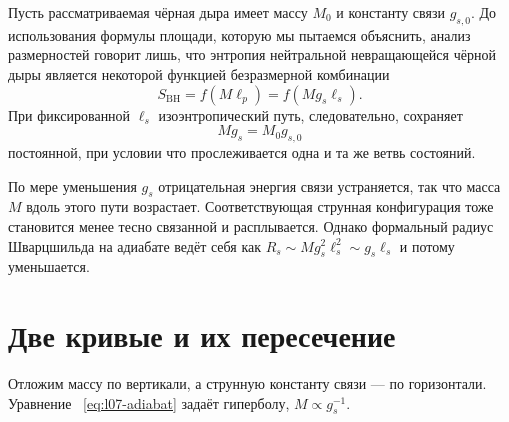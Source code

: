 Пусть рассматриваемая чёрная дыра имеет массу \(M_0\) и константу связи \(g_{s,0}\). До использования формулы площади, которую мы пытаемся объяснить, анализ размерностей говорит лишь, что энтропия нейтральной невращающейся чёрной дыры является некоторой функцией безразмерной комбинации
\begin{equation}
S_{\mathrm{BH}}=f(M\ell_p)
=f(Mg_s\ell_s).
\label{eq:l07-entropy-function}
\end{equation}
При фиксированной \(\ell_s\) изоэнтропический путь, следовательно, сохраняет
\begin{equation}
Mg_s=M_0g_{s,0}
\label{eq:l07-adiabat}
\end{equation}
постоянной, при условии что прослеживается одна и та же ветвь состояний.

По мере уменьшения \(g_s\) отрицательная энергия связи устраняется, так что масса \(M\) вдоль этого пути возрастает. Соответствующая струнная конфигурация тоже становится менее тесно связанной и расплывается. Однако формальный радиус Шварцшильда на адиабате ведёт себя как \(R_s\sim Mg_s^2\ell_s^2\sim g_s\ell_s\) и потому уменьшается.

\begin{classroomqa}
\end{classroomqa}

\section{Две кривые и их пересечение}

Отложим массу по вертикали, а струнную константу связи — по горизонтали. Уравнение ~\eqref{eq:l07-adiabat} задаёт гиперболу, \(M\propto g_s^{-1}\).

\begin{classroomqa}
\end{classroomqa}

